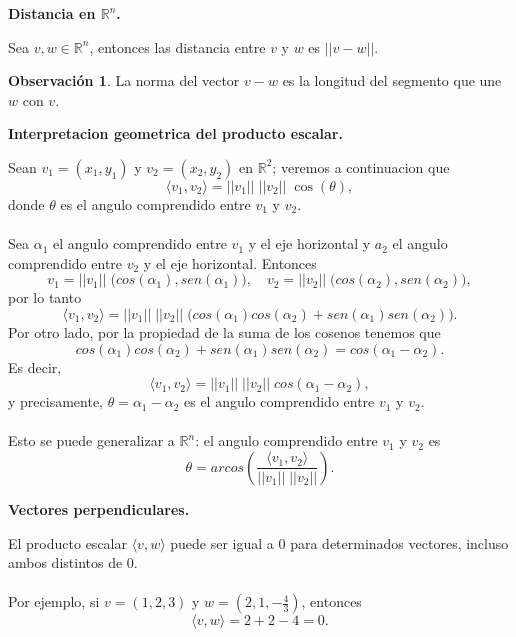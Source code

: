 \documentclass{article}
\theoremstyle{definition}
\theoremstyle{definition}
\newtheorem*{obs}{Observación}
\theoremstyle{remark}
\begin{document}
\begin{center}
\textbf{Distancia en $\mathbb{R}^n$.}
\end{center}
\begin{defi}
  Sea $v,w \in \mathbb{R}^n$, entonces las distancia entre $v$ y $w$ es $||v-w||$.
\end{defi}
\begin{obs}
  La norma del vector $v-w$ es la longitud del segmento que une $w$ con $v$.
\end{obs}
\begin{figure}[h]
\centering
\def\svgwidth{0.35\textwidth}

\end{figure}
 \pagebreak 
\begin{center}
  \textbf{Interpretacion geometrica del producto escalar.}
\end{center}
Sean $v_1=(x_1,y_1)$ y $v_2=(x_2,y_2)$ en $\mathbb{R}^2$; veremos a continuacion que \[
\langle v_1,v_2 \rangle = ||v_1|| \; ||v_2|| \; \cos(\theta),
\] donde $\theta$ es el angulo comprendido entre $v_1$ y $v_2$.
\\\\
Sea $\alpha_1$ el angulo comprendido entre $v_1$ y el eje horizontal y $a_2$ el angulo comprendido entre $v_2$ y el eje horizontal. Entonces \[
v_1=||v_1|| \; \big(cos(\alpha_1),sen(\alpha_1)\big), \quad v_2=||v_2||\; \big(cos(\alpha_2),sen(\alpha_2)\big),
\]
por lo tanto \[
\langle v_1,v_2 \rangle = ||v_1|| \; ||v_2|| \; \big(cos(\alpha_1)cos(\alpha_2)+sen(\alpha_1)sen(\alpha_2)\big).
\]
Por otro lado, por la propiedad de la suma de los cosenos tenemos que \[
cos(\alpha_1)cos(\alpha_2)+sen(\alpha_1)sen(\alpha_2)=cos(\alpha_1-\alpha_2).
\]
Es decir, \[
\langle v_1,v_2 \rangle = ||v_1|| \; ||v_2|| \; cos(\alpha_1-\alpha_2),
\]
y precisamente, $\theta=\alpha_1-\alpha_2$ es el angulo comprendido entre $v_1$ y $v_2$.\\\\ Esto se puede generalizar a $\mathbb{R}^n$: el angulo comprendido entre $v_1$ y $v_2$ es \[
  \theta = arcos\left(\frac{\langle v_1,v_2 \rangle}{||v_1|| \; ||v_2||}\right).
\]
\begin{center}
  \textbf{Vectores perpendiculares.}
\end{center}
El producto escalar $\langle v,w \rangle$ puede ser igual a $0$ para determinados vectores, incluso ambos distintos de $0$.\\\\
Por ejemplo, si $v=(1,2,3)$ y $w=(2,1,-\frac{4}{3})$, entonces \[
\langle v,w \rangle = 2+2-4=0.
\]
\end{document}
